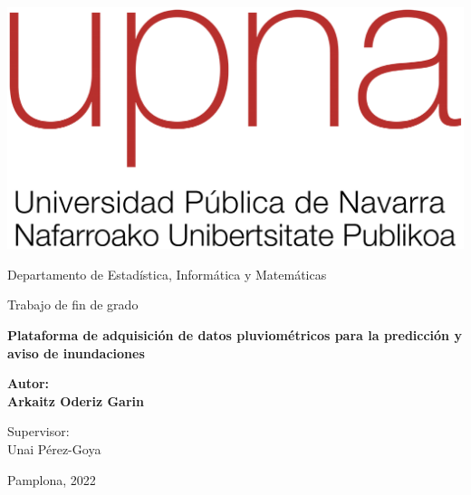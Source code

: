 \begin{titlepage}

  \begin{center}


    \includegraphics[scale=.3]{style/fig/ROJO_UPNA_300ppp.png}

    \vspace{0.5cm}
    \normalsize{Departamento de Estadística, Informática y Matemáticas}

    \vspace{2.5cm}

    {\large Trabajo de fin de grado}\\
    \vspace{1cm}

    \textbf{\Large Plataforma de adquisición de datos pluviométricos para la predicción y aviso de inundaciones}

    \vspace{3cm}

    \large{\textbf{Autor:}}\\
    \large{\textbf{Arkaitz Oderiz Garin}}\\

    \vspace{1cm}

    \large{Supervisor:}\\
    \large{Unai Pérez-Goya}\\

    \vspace{3cm}

    \large{Pamplona, 2022}

  \end{center}

\end{titlepage}

\clearpage
\thispagestyle{empty}
\hfill
\clearpage
